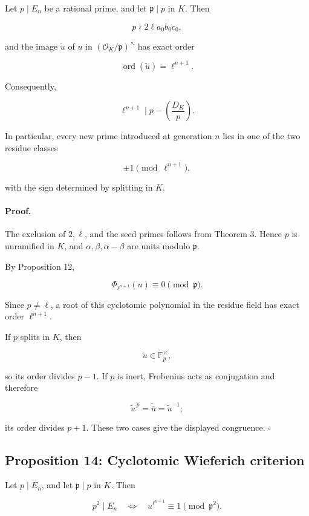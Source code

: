 \documentclass[11pt]{article}
\begin{document}
Let \(p\mid E_n\) be a rational prime, and let
\(\mathfrak p\mid p\) in \(K\). Then

\[
p\nmid2\ell a_0b_0c_0,
\]

and the image \(\widetilde u\) of \(u\) in
\((\mathcal O_K/\mathfrak p)^\times\) has exact order

\[
\operatorname{ord}(\widetilde u)
=
\ell^{n+1}.
\]

Consequently,

\[
\boxed{
\ell^{n+1}
\mid
p-\left(\frac{D_K}{p}\right).
}
\]

In particular, every new prime introduced at generation \(n\) lies in one
of the two residue classes

\[
\pm1\pmod{\ell^{n+1}},
\]

with the sign determined by splitting in \(K\).

\paragraph{Proof.}

The exclusion of \(2,\ell\), and the seed primes follows from Theorem 3.
Hence \(p\) is unramified in \(K\), and
\(\alpha,\beta,\alpha-\beta\) are units modulo \(\mathfrak p\).

By Proposition 12,

\[
\Phi_{\ell^{n+1}}(u)
\equiv0
\pmod{\mathfrak p}.
\]

Since \(p\neq\ell\), a root of this cyclotomic polynomial in the residue
field has exact order \(\ell^{n+1}\).

If \(p\) splits in \(K\), then

\[
\widetilde u\in\mathbb F_p^\times,
\]

so its order divides \(p-1\). If \(p\) is inert, Frobenius acts as
conjugation and therefore

\[
\widetilde u^{\,p}
=
\widetilde{\bar u}
=
\widetilde u^{-1};
\]

its order divides \(p+1\). These two cases give the displayed congruence.
\(\square\)

\subsection{Proposition 14: Cyclotomic Wieferich criterion}

Let \(p\mid E_n\), and let \(\mathfrak p\mid p\) in \(K\). Then

\[
p^2\mid E_n
\quad\Longleftrightarrow\quad
u^{\ell^{n+1}}
\equiv1
\pmod{\mathfrak p^2}.
\]
\end{document}
